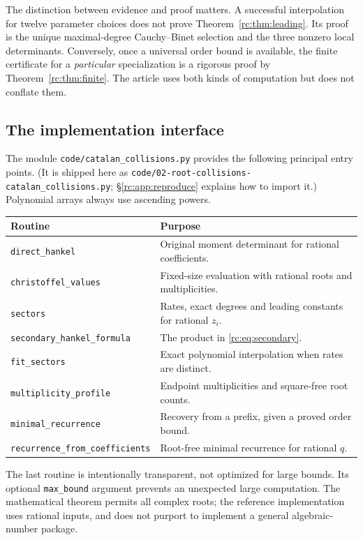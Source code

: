 \documentclass[11pt,a4paper]{article}
\numberwithin{equation}{section}
\theoremstyle{definition}
\theoremstyle{remark}
\begin{document}
The distinction between evidence and proof matters.  A successful
interpolation for twelve parameter choices does not prove
Theorem~\ref{rc:thm:leading}.  Its proof is the unique maximal-degree
Cauchy--Binet selection and the three nonzero local determinants.
Conversely, once a universal order bound is available, the finite
certificate for a \emph{particular} specialization is a rigorous proof
by Theorem~\ref{rc:thm:finite}.  The article uses both kinds of computation
but does not conflate them.

\subsection{The implementation interface}
The module \texttt{code/catalan\_collisions.py} provides the following
principal entry points.  (It is shipped here as
\nolinkurl{code/02-root-collisions-catalan_collisions.py};
\S\ref{rc:app:reproduce} explains how to import it.)  Polynomial arrays always use ascending powers.
\begin{center}\small
\begin{tabular}{@{}p{}p{}@{}}
\toprule
Routine & Purpose\\
\midrule
\texttt{direct\_hankel} & Original moment determinant for rational coefficients.\\
\texttt{christoffel\_values} & Fixed-size evaluation with rational roots and multiplicities.\\
\texttt{sectors} & Rates, exact degrees and leading constants for rational $z_i$.\\
\texttt{secondary\_hankel\_formula} & The product in \eqref{rc:eq:secondary}.\\
\texttt{fit\_sectors} & Exact polynomial interpolation when rates are distinct.\\
\texttt{multiplicity\_profile} & Endpoint multiplicities and square-free root counts.\\
\texttt{minimal\_recurrence} & Recovery from a prefix, given a proved order bound.\\
\texttt{recurrence\_from\_coefficients} & Root-free minimal recurrence for rational $q$.\\
\bottomrule
\end{tabular}
\end{center}
The last routine is intentionally transparent, not optimized for large
bounds.  Its optional \texttt{max\_bound} argument prevents an unexpected
large computation.  The mathematical theorem permits all complex roots;
the reference implementation uses rational inputs, and does not purport
to implement a general algebraic-number package.
\end{document}

